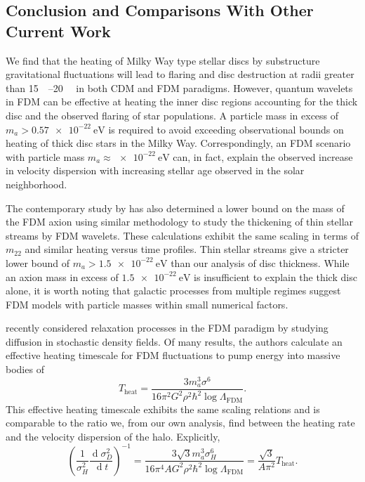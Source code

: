 \documentclass[usenatbib]{mnras}
\renewcommand{\d}[1]{\! \mathrm{d}#1 \:}
\newcommand{\deriv}[2]{\frac{\d{#1}}{\d{#2}}}
\renewcommand{\d}[1]{\ensuremath{\operatorname{d}\!{#1}}}
\begin{document}
\subsection{Conclusion and Comparisons With Other Current Work}

We find that the heating of Milky Way type stellar discs by substructure gravitational fluctuations will lead to flaring and disc destruction at radii greater than \SIrange{15}{20}{\kilo\parsec} in both CDM and FDM paradigms. However, quantum wavelets in FDM can be effective at heating the inner disc regions accounting for the thick disc and the observed flaring of star populations. A particle mass in excess of $m_a > \SI{0.57 e-22}{\electronvolt}$ is required to avoid exceeding observational bounds on heating of thick disc stars in the Milky Way. Correspondingly, an FDM scenario with particle mass $m_a \approx \SI{e-22}{\electronvolt}$ can, in fact, explain the observed increase in velocity dispersion with increasing stellar age observed in the solar neighborhood.  
\par
The contemporary study by \cite{stellar_streams_bound} has also determined a lower bound on the mass of the FDM axion using similar methodology to study the thickening of thin stellar streams by FDM wavelets. These calculations exhibit the same scaling in terms of $m_{22}$ and similar heating versus time profiles. Thin stellar streams give a stricter lower bound of $m_a > \SI{1.5 e-22}{\electronvolt}$ than our analysis of disc thickness. While an axion mass in excess of $\SI{1.5 e-22}{\electronvolt}$ is insufficient to explain the thick disc alone, it is worth noting that galactic processes from multiple regimes suggest FDM models with particle masses within small numerical factors.    
\par 
\cite{relaxation} recently considered relaxation processes in the FDM paradigm by studying diffusion in stochastic density fields. Of many results, the authors calculate an effective heating timescale for FDM fluctuations to pump energy into massive bodies of
\begin{equation}
T_{\text{heat}} = \frac{3 m_a^3 \sigma^6}{16 \pi^2 G^2 \rho^2 \hbar^2 \log{\Lambda_{\text{FDM}}}} .
\end{equation}  
This effective heating timescale exhibits the same scaling relations and is comparable to the ratio we, from our own analysis, find between the heating rate and the velocity dispersion of the halo. Explicitly,
\begin{equation}
\left( \frac{1}{\sigma_H^2} \deriv{\sigma_D^2}{t} \right)^{-1} = \frac{3 \sqrt{3} m_a^3 \sigma_H^6}{16 \pi^4 A G^2 \rho^2 \hbar^2 \log{\Lambda_{\text{FDM}}}} = \frac{\sqrt{3} }{A \pi^2} T_{\text{heat}}.
\end{equation}
\end{document}
